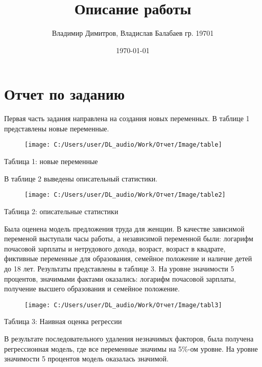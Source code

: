 \documentclass[a4paper,12pt]{article}
\author{Владимир Димитров, Владислав Балабаев гр. 19701}
\title{Описание работы}
\date{\today}
\begin{document}
	\maketitle
	\newpage
	\section{Отчет по заданию}
	Первая часть задания направлена на создания новых переменных. В таблице 1 представлены новые переменные. 

	\begin{figure}[H]
		\centering
		\texttt{[image: C:/Users/user/DL\_audio/Work/Отчет/Image/table]}
		
		\label{fig:table}
	\end{figure}
	\begin{center}
		Таблица 1: новые переменные
	\end{center}
	
	В таблице 2 выведены описательный статистики.
	
	\begin{figure}[H]
		\centering
		\texttt{[image: C:/Users/user/DL\_audio/Work/Отчет/Image/table2]}
		\label{fig:table2}
	\end{figure}
	\begin{center} Таблица 2: описательные статистики
	\end{center}
	Была оценена модель предложения труда для женщин. В качестве зависимой переменой выступали часы работы, а независимой переменной были: логарифм почасовой зарплаты и нетрудового дохода, возраст, возраст в квадрате, фиктивные переменные для образования, семейное положение и наличие детей до 18 лет. Результаты представлены в таблице 3. На уровне значимости 5 процентов, значимыми фактами оказались: логарифм почасовой зарплаты, получение высшего образования и семейное положение.
	\begin{figure}[H]
		\centering
		\texttt{[image: C:/Users/user/DL\_audio/Work/Отчет/Image/tabl3]}
		\label{fig:tabl3}
	\end{figure}
	\begin{center} Таблица 3: Наивная оценка регрессии
	\end{center}
	В результате последовательного удаления незначимых факторов, была получена регрессионная модель, где все переменные значимы на 5\%-ом уровне. На уровне значимости 5 процентов модель оказалась значимой.
	
\end{document}

